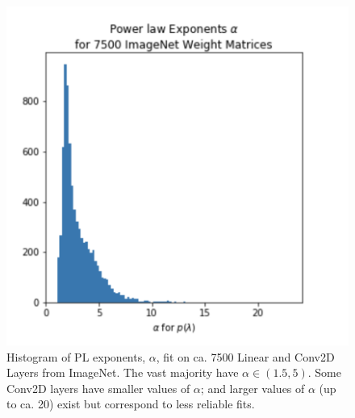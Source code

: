 \begin{figure}[!htb]
   \centering
   \includegraphics[scale=0.40]{img/power-law-histogram.png} 
   \caption{%
            Histogram of PL exponents, $\alpha$, fit on ca. 7500 Linear and Conv2D Layers from ImageNet. 
            The vast majority have $\alpha\in(1.5,5)$. 
            Some Conv2D layers have smaller values of $\alpha$; and larger values of $\alpha$ (up to ca. 20) exist but correspond to less reliable fits.
            }
   \label{fig:power-law-histogram}
\end{figure}





